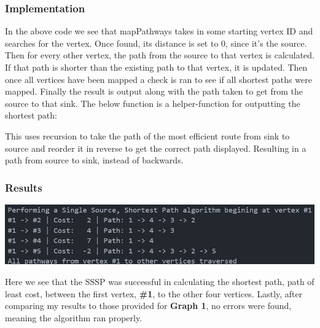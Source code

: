 \documentclass[12pt, letterpaper]{article}
\begin{document}
\subsubsection{Implementation}
\begin{center}
   
\end{center}
In the above code we see that mapPathways takes in some starting vertex ID and searches for the vertex.
Once found, its distance is set to 0, since it's the source.
Then for every other vertex, the path from the source to that vertex is calculated.
If that path is shorter than the existing path to that vertex, it is updated.
Then once all vertices have been mapped a check is ran to see if all shortest paths were mapped.
Finally the result is output along with the path taken to get from the source to that sink.
\vspace*{5px}
\newline
The below function is a helper-function for outputting the shortest path:
\begin{center}
   
\end{center}
This uses recursion to take the path of the most efficient route from sink to source and reorder it in reverse to get the correct path displayed.
Resulting in a path from source to sink, instead of backwards.

\subsubsection{Results}
\begin{center}
   \includegraphics{results/Graph1_SSSP.png}
\end{center}
Here we see that the SSSP was successful in calculating the shortest path, path of least cost, between the first vertex, \textbf{\#1}, to the other four vertices.
Lastly, after comparing my results to those provided for \textbf{Graph 1}, no errors were found, meaning the algorithm ran properly.
\end{document}
